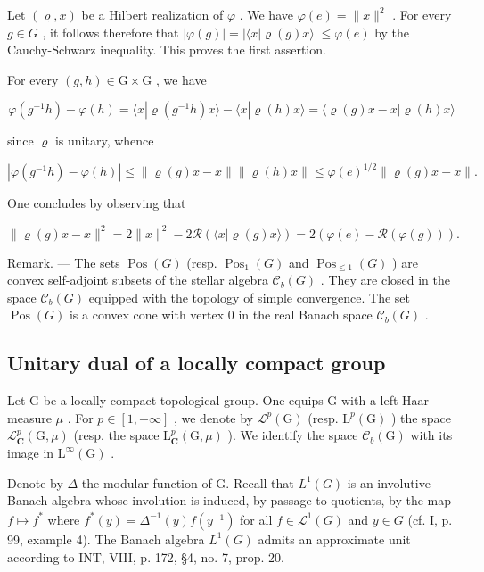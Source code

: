 Let \((\varrho, x)\) be a Hilbert realization of \(\varphi\) . We have \(\varphi(e) = \|x\|^2\) . For every \(g \in G\) , it follows therefore that \(|\varphi(g)| = |\langle x | \varrho(g)x\rangle| \leqslant \varphi(e)\) by the Cauchy-Schwarz inequality. This proves the first assertion.

For every \((g,h)\in \mathrm{G}\times \mathrm{G}\) , we have

\[
\varphi (g ^ {- 1} h) - \varphi (h) = \langle x | \varrho (g ^ {- 1} h) x \rangle - \langle x | \varrho (h) x \rangle = \langle \varrho (g) x - x | \varrho (h) x \rangle
\]

since \(\varrho\) is unitary, whence

\[
| \varphi (g ^ {- 1} h) - \varphi (h) | \leqslant \| \varrho (g) x - x \| \| \varrho (h) x \| \leqslant \varphi (e) ^ {1 / 2} \| \varrho (g) x - x \|.
\]

One concludes by observing that

\[
\| \varrho (g) x - x \| ^ {2} = 2 \| x \| ^ {2} - 2 \mathcal {R} (\langle x | \varrho (g) x \rangle) = 2 (\varphi (e) - \mathcal {R} (\varphi (g))).
\]

Remark. --- The sets \(\operatorname{Pos}(G)\) (resp. \(\operatorname{Pos}_{1}(G)\) and \(\operatorname{Pos}_{\leqslant1}(G)\) ) are convex self-adjoint subsets of the stellar algebra \(\mathcal{C}_{b}(G)\) . They are closed in the space \(\mathcal{C}_{b}(G)\) equipped with the topology of simple convergence. The set \(\operatorname{Pos}(G)\) is a convex cone with vertex 0 in the real Banach space \(\mathcal{C}_{b}(G)\) .

\subsection{Unitary dual of a locally compact group}

Let G be a locally compact topological group. One equips G with a left Haar measure \(\mu\) . For \(p \in [1, +\infty]\) , we denote by \(\mathcal{L}^{p}(\mathrm{G})\) (resp. \(\mathrm{L}^{p}(\mathrm{G})\) ) the space \(\mathcal{L}_{\mathbf{C}}^{p}(\mathrm{G}, \mu)\) (resp. the space \(\mathrm{L}_{\mathbf{C}}^{p}(\mathrm{G}, \mu)\) ). We identify the space \(\mathcal{C}_{b}(\mathrm{G})\) with its image in \(\mathrm{L}^{\infty}(\mathrm{G})\) .

Denote by \(\Delta\) the modular function of G. Recall that \(L^1(G)\) is an involutive Banach algebra whose involution is induced, by passage to quotients, by the map \(f \mapsto f^*\) where \(f^*(y) = \Delta^{-1}(y)\overline{f(y^{-1})}\) for all \(f \in \mathcal{L}^1(G)\) and \(y \in G\) (cf. I, p. 99, example 4). The Banach algebra \(L^1(G)\) admits an approximate unit according to INT, VIII, p. 172, §4, no. 7, prop. 20.

